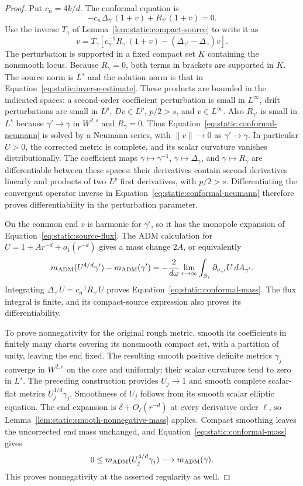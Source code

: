 \begin{proof}
Put $c_n=4k/d$.  The conformal equation is
\[
 -c_n\Delta_{\gamma'}(1+v)+R_{\gamma'}(1+v)=0.
\]
Use the inverse $T_\gamma$ of
Lemma~\ref{lem:static:compact-source} to write it as
\begin{equation}
 v=T_\gamma\left[
       c_n^{-1}R_{\gamma'}(1+v)
          -(\Delta_{\gamma'}-\Delta_\gamma)v\right].
 \label{eq:static:conformal-neumann}
\end{equation}
The perturbation is supported in a fixed compact set $K$ containing
the nonsmooth locus.  Because $R_\gamma=0$, both terms in brackets
are supported in $K$.  The source norm is $L^s$ and the solution norm is that in
Equation~\eqref{eq:static:inverse-estimate}.  These products are
bounded in the indicated spaces: a second-order coefficient
perturbation is small in $L^\infty$, drift perturbations are small
in $L^p$, $Dv\in L^p$, $p/2>s$, and $v\in L^\infty$.
Also $R_{\gamma'}$ is small in $L^s$ because
$\gamma'\to\gamma$ in $W^{2,s}$ and $R_\gamma=0$.
Thus Equation~\eqref{eq:static:conformal-neumann} is solved by a
Neumann series, with $\|v\|\to0$ as $\gamma'\to\gamma$.
In particular $U>0$, the corrected metric is complete, and its
scalar curvature vanishes distributionally.  The coefficient maps $\gamma\mapsto\gamma^{-1}$,
$\gamma\mapsto\Delta_\gamma$, and $\gamma\mapsto R_\gamma$
are differentiable between these spaces: their derivatives contain
second derivatives linearly and products of two $L^p$ first
derivatives, with $p/2>s$.  Differentiating the convergent operator
inverse in Equation~\eqref{eq:static:conformal-neumann} therefore
proves differentiability in the perturbation parameter.

On the common end $v$ is harmonic for $\gamma'$, so it has the
monopole expansion of
Equation~\eqref{eq:static:source-flux}.  The ADM calculation for
$U=1+A r^{-d}+o_1(r^{-d})$ gives a mass change $2A$, or equivalently
\[
 m_{\rm ADM}(U^{4/d}\gamma')-m_{\rm ADM}(\gamma')
  =-\frac{2}{d\omega}
       \lim_{r\to\infty}\int_{S_r}
                   \partial_{\nu_{\gamma'}}U\,dA_{\gamma'}.
\]
Integrating $\Delta_{\gamma'}U=c_n^{-1}R_{\gamma'}U$ proves
Equation~\eqref{eq:static:conformal-mass}.  The flux integral is
finite, and its compact-source expression also proves its
differentiability.

To prove nonnegativity for the original rough metric, smooth its
coefficients in finitely many charts covering its nonsmooth compact
set, with a partition of unity, leaving the end fixed.  The resulting
smooth positive definite metrics $\gamma_j$ converge in $W^{2,s}$
on the core and uniformly; their scalar curvatures tend to zero in
$L^s$.  The preceding construction provides $U_j\to1$ and smooth
complete scalar-flat metrics $U_j^{4/d}\gamma_j$.  Smoothness of
$U_j$ follows from its smooth scalar elliptic equation.  The end
expansion is $\delta+O_\ell(r^{-d})$ at every derivative order $\ell$, so
Lemma~\ref{lem:static:smooth-nonnegative-mass} applies.  Compact
smoothing leaves the uncorrected end mass unchanged, and
Equation~\eqref{eq:static:conformal-mass} gives
\[
 0\le m_{\rm ADM}(U_j^{4/d}\gamma_j)
          \longrightarrow m_{\rm ADM}(\gamma).
\]
This proves nonnegativity at the asserted regularity as well.
\end{proof}

